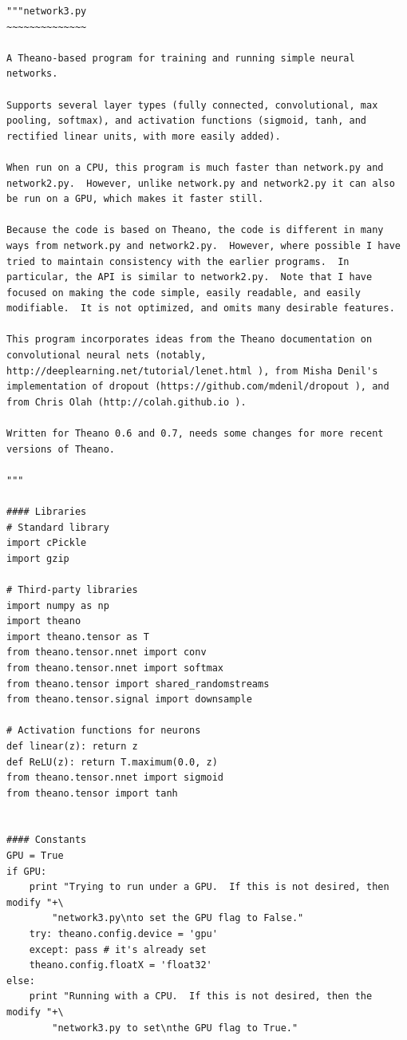 \begin{lstlisting}
"""network3.py
~~~~~~~~~~~~~~

A Theano-based program for training and running simple neural
networks.

Supports several layer types (fully connected, convolutional, max
pooling, softmax), and activation functions (sigmoid, tanh, and
rectified linear units, with more easily added).

When run on a CPU, this program is much faster than network.py and
network2.py.  However, unlike network.py and network2.py it can also
be run on a GPU, which makes it faster still.

Because the code is based on Theano, the code is different in many
ways from network.py and network2.py.  However, where possible I have
tried to maintain consistency with the earlier programs.  In
particular, the API is similar to network2.py.  Note that I have
focused on making the code simple, easily readable, and easily
modifiable.  It is not optimized, and omits many desirable features.

This program incorporates ideas from the Theano documentation on
convolutional neural nets (notably,
http://deeplearning.net/tutorial/lenet.html ), from Misha Denil's
implementation of dropout (https://github.com/mdenil/dropout ), and
from Chris Olah (http://colah.github.io ).

Written for Theano 0.6 and 0.7, needs some changes for more recent
versions of Theano.

"""

#### Libraries
# Standard library
import cPickle
import gzip

# Third-party libraries
import numpy as np
import theano
import theano.tensor as T
from theano.tensor.nnet import conv
from theano.tensor.nnet import softmax
from theano.tensor import shared_randomstreams
from theano.tensor.signal import downsample

# Activation functions for neurons
def linear(z): return z
def ReLU(z): return T.maximum(0.0, z)
from theano.tensor.nnet import sigmoid
from theano.tensor import tanh


#### Constants
GPU = True
if GPU:
    print "Trying to run under a GPU.  If this is not desired, then modify "+\
        "network3.py\nto set the GPU flag to False."
    try: theano.config.device = 'gpu'
    except: pass # it's already set
    theano.config.floatX = 'float32'
else:
    print "Running with a CPU.  If this is not desired, then the modify "+\
        "network3.py to set\nthe GPU flag to True."


\end{lstlisting}
